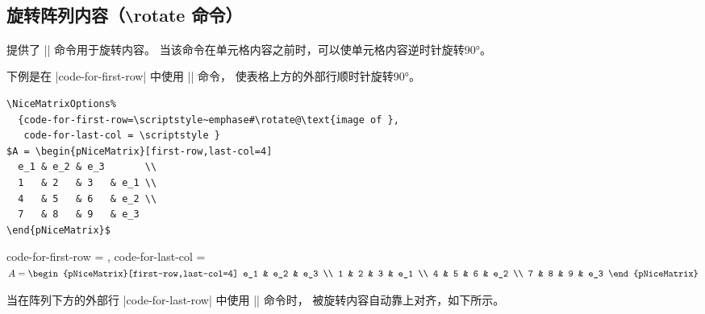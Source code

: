 \documentclass[dvipsnames]{article}%
\begin{document}
\subsection{旋转阵列内容（\texttt{\textbackslash}rotate 命令）}

  提供了 |\rotate| 命令用于旋转内容。
 当该命令在单元格内容之前时，可以使单元格内容逆时针旋转90°。

下例是在 |code-for-first-row| 中使用 |\rotate| 命令，
使表格上方的外部行顺时针旋转90°。

\bigskip

\begin{BVerbatim}[baseline=c,boxwidth=11cm]
\NiceMatrixOptions%
  {code-for-first-row=\scriptstyle~emphase#\rotate@\text{image of },
   code-for-last-col = \scriptstyle }
$A = \begin{pNiceMatrix}[first-row,last-col=4]
  e_1 & e_2 & e_3       \\
  1   & 2   & 3   & e_1 \\
  4   & 5   & 6   & e_2 \\
  7   & 8   & 9   & e_3 
\end{pNiceMatrix}$
\end{BVerbatim}
\begin{varwidth}{10cm}
\NiceMatrixOptions%
{code-for-first-row = \scriptstyle\rotate {},
code-for-last-col = \scriptstyle }
$ A = \begin{pNiceMatrix}[first-row,last-col=4]
e_1 & e_2 & e_3 \\
1   & 2   & 3  & e_1 \\
4   & 5   & 6  & e_2 \\
7   & 8   & 9  & e_3 
\end{pNiceMatrix}$
\end{varwidth}

\bigskip
当在阵列下方的外部行 |code-for-last-row| 中使用 |\rotate| 命令时，
被旋转内容自动靠上对齐，如下所示。
\end{document}
